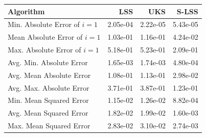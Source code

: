 \begin{tabular}{lrrr}
\toprule
Algorithm & LSS & UKS & S-LSS \\
\midrule
Min. Absolute Error of $i=1$ & 2.05e-04 & 2.22e-05 & 5.43e-05 \\
Mean Absolute Error of $i=1$ & 1.03e-01 & 1.16e-01 & 4.24e-02 \\
Max. Absolute Error of $i=1$ & 5.18e-01 & 5.23e-01 & 2.09e-01 \\
\midrule
Avg. Min. Absolute Error & 1.65e-03 & 1.74e-03 & 4.80e-04 \\
Avg. Mean Absolute Error & 1.08e-01 & 1.13e-01 & 2.98e-02 \\
Avg. Max. Absolute Error & 3.71e-01 & 3.87e-01 & 1.23e-01 \\
\midrule
Min. Mean Squared Error & 1.15e-02 & 1.26e-02 & 8.82e-04 \\
Avg. Mean Squared Error & 1.82e-02 & 1.99e-02 & 1.60e-03 \\
Max. Mean Squared Error & 2.83e-02 & 3.10e-02 & 2.74e-03 \\
\bottomrule
\end{tabular}
